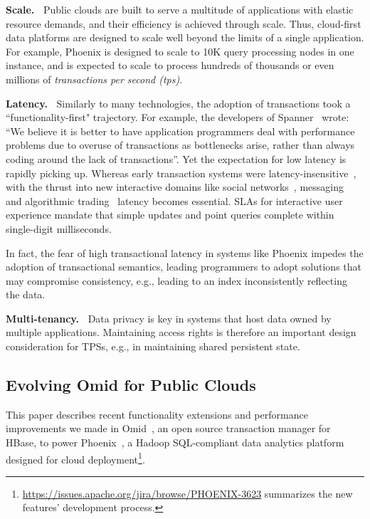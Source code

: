 {\bf Scale.\ } 
Public clouds  are built to  serve a multitude of applications 
with elastic resource demands, and their efficiency is achieved through  scale. 
Thus, cloud-first data platforms are  designed to scale well beyond the limits of a single application. 
For example, Phoenix is designed to scale to 10K query processing 
nodes in one instance, and is expected to scale to process hundreds
 of thousands or even millions of \emph{transactions per second (tps)}. 
 

{\bf Latency.\ }
Similarly to many technologies, the adoption of transactions took a  ``functionality-first" trajectory. 
For example, the developers of Spanner~\cite{Spanner2012} wrote: 
  ``We believe it
is better to have application programmers deal with performance problems due to overuse 
of transactions as bottlenecks arise, rather than always coding around the lack of transactions''. 
Yet the expectation for low latency is rapidly picking up. 
Whereas early transaction systems were  latency-insensitive~\cite{Percolator2010, Omid2017}, 
with the thrust into new interactive domains like social networks~\cite{chatter},  
messaging~\cite{Borthakur:2011} and algorithmic trading~\cite{opentsdb} latency becomes essential.  
SLAs for interactive user experience mandate that simple updates and point queries  complete within 
single-digit milliseconds. 

In fact, the fear of high transactional latency in systems like Phoenix impedes the adoption of transactional semantics,
leading  programmers to  adopt solutions that may compromise consistency, e.g., 
leading to an index inconsistently reflecting the data.

{\bf Multi-tenancy.\ } Data privacy is key in systems that host data owned by multiple applications.
Maintaining  access rights is therefore an important design consideration for TPSs, 
e.g., in maintaining shared persistent state. 

\subsection{Evolving Omid for Public Clouds}

This paper describes recent functionality extensions and performance improvements 
we made in Omid~\cite{omid}, an open source transaction manager for HBase, to power 
Phoenix~\cite{phoenix},  a Hadoop SQL-compliant  data analytics platform designed 
for cloud deployment\footnote{\small{\url{https://issues.apache.org/jira/browse/PHOENIX-3623}
summarizes the new features' development process.}}. 

